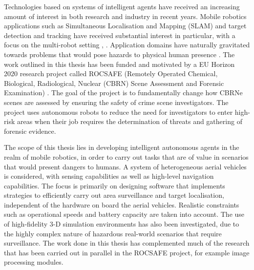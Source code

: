 
Technologies based on systems of intelligent agents have received an increasing amount of interest in both research and industry in recent years. Mobile robotics applications such as Simultaneous Localisation and Mapping (SLAM) \cite{Thrun:2005:ProbabilisticRobotics} and target detection and tracking have received substantial interest in particular, with a focus on the multi-robot setting \cite{Saeedi2016Multiple-RobotReview}, \cite{Robin2016Multi-robotSurvey}. 
Application domains have naturally gravitated towards problems that would pose hazards to physical human presence \cite{Muller2014ApplicationSurvey}. The work outlined in this thesis has been funded and motivated by a EU Horizon 2020 research project called ROCSAFE (Remotely Operated Chemical, Biological, Radiological, Nuclear (CBRN) Scene Assessment and Forensic Examination) \cite{Bagherzadeh2017ROCSAFE:Incidents}. The goal of the project is to fundamentally change how CBRNe scenes are assessed by ensuring the safety of crime scene investigators. The project uses autonomous robots to reduce the need for investigators to enter high-risk areas when their job requires the determination of threats and gathering of  forensic evidence.\par

The scope of this thesis lies in developing intelligent autonomous agents in the realm of mobile robotics, in order to carry out tasks that are of value in scenarios that would present dangers to humans. A system of heterogeneous aerial vehicles is considered, with sensing capabilities as well as high-level navigation capabilities. The focus is primarily on designing software that implements strategies to efficiently carry out area surveillance and target localisation, independent of the hardware on board the aerial vehicles. Realistic constraints such as operational speeds and battery capacity are taken into account. The use of high-fidelity 3-D simulation environments has also been investigated, due to the highly complex nature of hazardous real-world scenarios that require surveillance. The work done in this thesis has complemented much of the research that has been carried out in parallel in the ROCSAFE project, for example image processing modules.\par